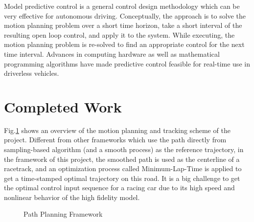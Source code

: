 \documentclass[conference, onecolumn]{IEEEtran}
\begin{document}
Model predictive control is a general control design
methodology which can be very effective for autonomous driving. Conceptually, the approach is to solve the motion planning problem over a short time horizon, take a short interval of the resulting open loop control, and apply it to the system. While executing, the motion planning problem is re-solved to find an appropriate control for the next time interval. Advances in computing hardware as well as mathematical programming
algorithms have made predictive control feasible for real-time use in driverless vehicles. 


\section{Completed Work}

Fig.\ref{fig:framework} shows an overview of the motion planning and tracking scheme of the project. Different from other frameworks which use the path directly from sampling-based algorithm (and a smooth process) as the reference trajectory, in the framework of this project, the smoothed path is used as the centerline of a racetrack, and an optimization process called Minimum-Lap-Time is applied to get a time-stamped optimal trajectory on this road. It is a big challenge to get the optimal control input sequence for a racing car due to its high speed and nonlinear behavior of the high fidelity model. 

\begin{figure}[h]
	\centering
	\captionsetup{justification=centering}
	\caption{Path Planning Framework}
	\label{fig:framework}
\end{figure}
\end{document}
